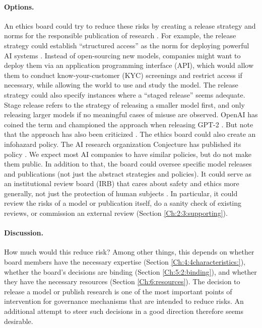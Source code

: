 \documentclass{article}
\begin{document}
\paragraph{Options.} An ethics board could try to reduce these risks by creating a release strategy \cite{solaiman2019release, solaiman2023gradient, openai2022bestpractices} and norms for the responsible publication of research \cite{crootof2019artificial, ashurst2022ai, shevlane2022structured, partnershiponai2021managingrisks}. For example, the release strategy could establish “structured access” as the norm for deploying powerful AI systems \cite{shevlane2022structured}. Instead of open-sourcing new models, companies might want to deploy them via an application programming interface (API), which would allow them to conduct know-your-customer (KYC) screenings and restrict access if necessary, while allowing the world to use and study the model. The release strategy could also specify instances where a “staged release” seems adequate. Stage release refers to the strategy of releasing a smaller model first, and only releasing larger models if no meaningful cases of misuse are observed. OpenAI has coined the term and championed the approach when releasing GPT-2 \cite{solaiman2019release}. But note that the approach has also been criticized \cite{crootof2019artificial}. The ethics board could also create an infohazard policy. The AI research organization Conjecture has published its policy \cite{leahy2022conjecture}. We expect most AI companies to have similar policies, but do not make them public. In addition to that, the board could oversee specific model releases and publications (not just the abstract strategies and policies). It could serve as an institutional review board (IRB) that cares about safety and ethics more generally, not just the protection of human subjects \cite{bernstein2021ethics, srikumar2022advancing}. In particular, it could review the risks of a model or publication itself, do a sanity check of existing reviews, or commission an external review (Section \ref{Ch:2:3:supporting}).

\paragraph{Discussion.} How much would this reduce risk? Among other things, this depends on whether board members have the necessary expertise (Section \ref{Ch:4:4characteristics:}), whether the board’s decisions are binding (Section \ref{Ch:5:2:binding}), and whether they have the necessary resources (Section \ref{Ch:6:resources}). The decision to release a model or publish research is one of the most important points of intervention for governance mechanisms that are intended to reduce risks. An additional attempt to steer such decisions in a good direction therefore seems desirable.
\end{document}
